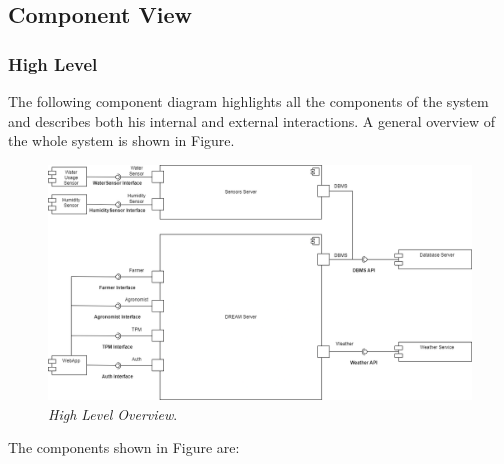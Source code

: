 \subsection{Component View}
\subsubsection{High Level}
The following component diagram highlights all the components of the system and describes both his internal and external interactions. A general overview of the whole system is shown in Figure.\\
\begin{figure}[H]
    \centering
    \includegraphics[scale=0.4]{Images/Components/ComponentDiagram - HL.png}
    \caption{\textit{High Level Overview}.}
\end{figure}
The components shown in Figure are:
